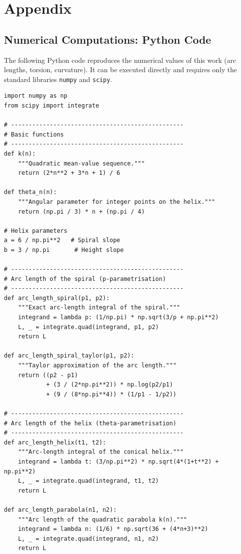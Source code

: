 \appendix
\chapter{Appendix}

\section{Numerical Computations: Python Code}

The following Python code reproduces the numerical values of this work
(arc lengths, torsion, curvature). It can be executed directly and
requires only the standard libraries \texttt{numpy} and \texttt{scipy}.

\begin{verbatim}
import numpy as np
from scipy import integrate

# -------------------------------------------------
# Basic functions
# -------------------------------------------------
def k(n):
    """Quadratic mean-value sequence."""
    return (2*n**2 + 3*n + 1) / 6

def theta_n(n):
    """Angular parameter for integer points on the helix."""
    return (np.pi / 3) * n + (np.pi / 4)

# Helix parameters
a = 6 / np.pi**2   # Spiral slope
b = 3 / np.pi       # Height slope

# -------------------------------------------------
# Arc length of the spiral (p-parametrisation)
# -------------------------------------------------
def arc_length_spiral(p1, p2):
    """Exact arc-length integral of the spiral."""
    integrand = lambda p: (1/np.pi) * np.sqrt(3/p + np.pi**2)
    L, _ = integrate.quad(integrand, p1, p2)
    return L

def arc_length_spiral_taylor(p1, p2):
    """Taylor approximation of the arc length."""
    return ((p2 - p1)
            + (3 / (2*np.pi**2)) * np.log(p2/p1)
            + (9 / (8*np.pi**4)) * (1/p1 - 1/p2))

# -------------------------------------------------
# Arc length of the helix (theta-parametrisation)
# -------------------------------------------------
def arc_length_helix(t1, t2):
    """Arc-length integral of the conical helix."""
    integrand = lambda t: (3/np.pi**2) * np.sqrt(4*(1+t**2) + np.pi**2)
    L, _ = integrate.quad(integrand, t1, t2)
    return L

def arc_length_parabola(n1, n2):
    """Arc length of the quadratic parabola k(n)."""
    integrand = lambda n: (1/6) * np.sqrt(36 + (4*n+3)**2)
    L, _ = integrate.quad(integrand, n1, n2)
    return L


\end{verbatim}
